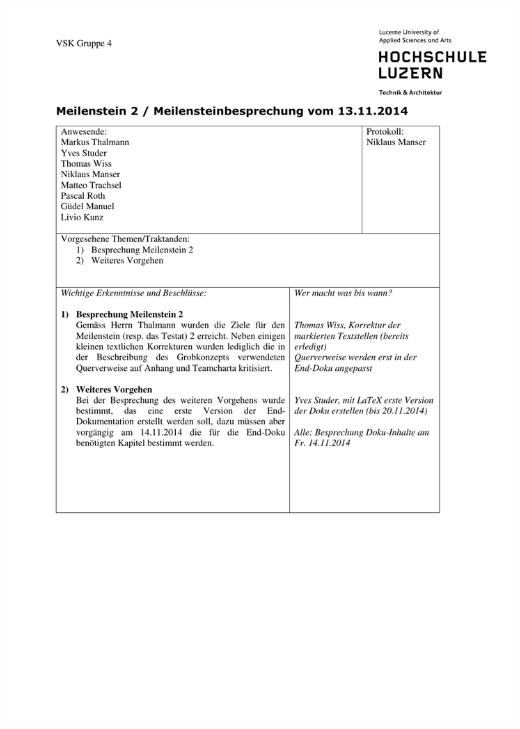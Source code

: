   	 \includegraphics[page=1,width=\textwidth]{Enddokumentation/Anhang/Extern/Besprechung_MS2.pdf}


    
    \newpage
    \listoffigures      
    
    \begin{flushleft}
        \renewcommand{\refname}{Literatur- und Quellenverzeichnis}
    \end{flushleft}
    \appendix
    
      
